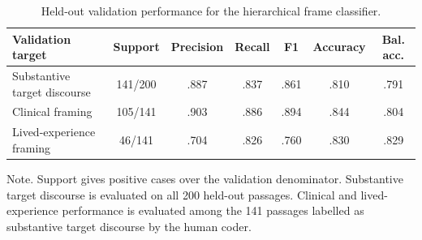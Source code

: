 \begin{table}[htbp]
\centering
\caption{Held-out validation performance for the hierarchical frame classifier.}
\label{tab:lsc-classification-validation}
\small
\begin{tabular}{@{}lcccccc@{}}
\toprule
Validation target & Support & Precision & Recall & F1 & Accuracy & Bal. acc. \\
\midrule
Substantive target discourse & 141/200 & .887 & .837 & .861 & .810 & .791 \\
Clinical framing & 105/141 & .903 & .886 & .894 & .844 & .804 \\
Lived-experience framing & 46/141 & .704 & .826 & .760 & .830 & .829 \\
\bottomrule
\end{tabular}
\parbox{\linewidth}{\footnotesize Note. Support gives positive cases over the validation denominator. Substantive target discourse is evaluated on all 200 held-out passages. Clinical and lived-experience performance is evaluated among the 141 passages labelled as substantive target discourse by the human coder.}
\end{table}
